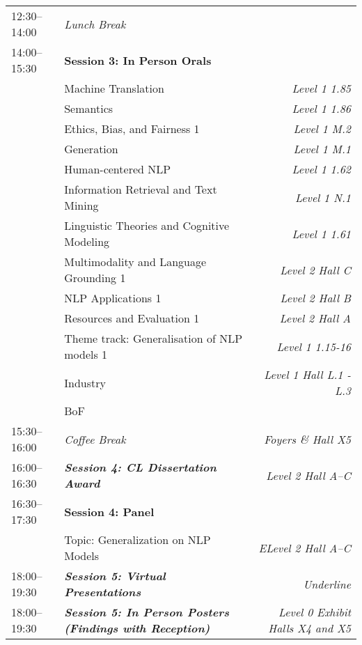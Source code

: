 \begin{xltabular}{\linewidth}{l X r}
    12:30--14:00    &   \textit{Lunch Break}  & \\

    14:00--15:30    &   \textbf{Session 3: In Person Orals}   &   \\
    &   Machine Translation   &   \textit{Level 1 1.85} \\
    &   Semantics  &   \textit{Level 1 1.86} \\
    &   Ethics, Bias, and Fairness 1  &   \textit{Level 1 M.2} \\
    &   Generation  &   \textit{Level 1 M.1} \\
    &   Human-centered NLP  &   \textit{Level 1 1.62} \\
    &   Information Retrieval and Text Mining  &   \textit{Level 1 N.1} \\
    &   Linguistic Theories and Cognitive Modeling  &   \textit{Level 1 1.61} \\
    &   Multimodality and Language Grounding 1  &   \textit{Level 2 Hall C} \\
    &   NLP Applications 1  &   \textit{Level 2 Hall B} \\
    &   Resources and Evaluation 1  &   \textit{Level 2 Hall A} \\
    &   Theme track: Generalisation of NLP models 1  &   \textit{Level 1 1.15-16} \\
    &   Industry  &   \textit{Level 1 Hall L.1 - L.3} \\
    &   BoF &   \\

    15:30--16:00    &   \textit{Coffee Break}    &  \textit{Foyers \& Hall X5} \\

    16:00--16:30    &   \textit{\textbf{Session 4: CL Dissertation Award}}    &  \textit{Level 2 Hall A--C} \\

    16:30--17:30    &   \textbf{Session 4: Panel}  &   \\
    &   Topic: Generalization on NLP Models    &   \textit{ELevel 2 Hall A--C} \\

    18:00--19:30    &   \textit{\textbf{Session 5: Virtual Presentations}}    & \textit{Underline}  \\
    18:00--19:30    &   \textit{\textbf{Session 5: In Person Posters (Findings with Reception)}}    &  \textit{Level 0 Exhibit Halls X4 and X5} \\


\end{xltabular}

